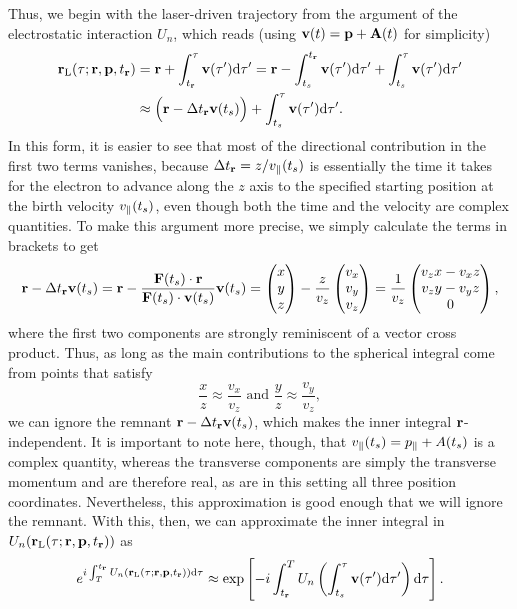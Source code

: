 Thus, we begin with the laser-driven trajectory from the argument of the electrostatic interaction $U_n$, which reads (using $\vb{v}(t)=\vb{p}+\vb{A}(t)$ for simplicity)
\begin{align}
\vb{r}_\mathrm{L}(\tau;\vb{r},\vb{p},{t_{\vb{r}}})
& =
\vb{r}+\int_{t_{\vb{r}}}^\tau \vb{v}(\tau')\mathrm{d}\tau'
=
\vb{r}-\int^{t_{\vb{r}}}_{{t_s}} \vb{v}(\tau')\mathrm{d}\tau'+\int_{{t_s}}^\tau \vb{v}(\tau')\mathrm{d}\tau'
\nonumber \\ & \approx
\Big( \vb{r} - \Delta{t_{\ensuremath{\vb{r}}}}\vb{v}({t_s}) \Big) + \int_{{t_s}}^\tau \vb{v}(\tau')\mathrm{d}\tau'.
\end{align}
In this form, it is easier to see that most of the directional contribution in the first two terms vanishes, because $\Delta{t_{\ensuremath{\vb{r}}}} = z/{v_{\parallel}}({t_s})$ is essentially the time it takes for the electron to advance along the $z$ axis to the specified starting position at the birth velocity ${v_{\parallel}}({t_s})$, even though both the time and the velocity are complex quantities. To make this argument more precise, we simply calculate the terms in brackets to get
\begin{align}
\vb{r} - \Delta{t_{\ensuremath{\vb{r}}}} \vb{v}({t_s})
= 
\vb{r} - \frac{\vb{F}({t_s})\cdot\vb{r}}{\vb{F}({t_s})\cdot\vb{v}({t_s})} \vb{v}({t_s}) 
=
\begin{pmatrix}x\\y\\z\end{pmatrix} - \frac{z}{v_z}\begin{pmatrix}v_x\\v_y\\v_z \end{pmatrix}=\frac{1}{v_z}\begin{pmatrix}v_z x-v_x z\\v_z y-v_y z\\0\end{pmatrix},
\end{align}
where the first two components are strongly reminiscent of a vector cross product. Thus, as long as the main contributions to the spherical integral come from points that satisfy
\begin{equation}
\frac{x}{z}\approx \frac{v_x}{v_z}\textrm{ and }\frac{y}{z}\approx \frac{v_y}{v_z},
\end{equation}
we can ignore the remnant $\vb{r} - \Delta{t_{\ensuremath{\vb{r}}}} \vb{v}({t_s})$, which makes the inner integral $\vb{r}$-independent. It is important to note here, though, that ${v_{\parallel}}({t_s}) = {p_{\parallel}} + A({t_s})$ is a complex quantity, whereas the transverse components are simply the transverse momentum and are therefore real, as are in this setting all three position coordinates. Nevertheless, this approximation is good enough that we will ignore the remnant. With this, then, we can approximate the inner integral in $U_n(\vb{r}_\mathrm{L}(\tau;\vb{r},\vb{p},{t_{\vb{r}}}))$ as
\begin{equation}
e^{i\int_T^{t_{\vb{r}}} U_n(\vb{r}_\mathrm{L}(\tau;\vb{r},\vb{p},{t_{\vb{r}}}))\mathrm{d}\tau}
\approx 
\exp\left[{-i\int_{t_{\vb{r}}}^T U_n\left(\int_{ {t_s}}^\tau \vb{v}(\tau')\mathrm{d}\tau'\right) \mathrm{d}\tau}\right].
\end{equation}


